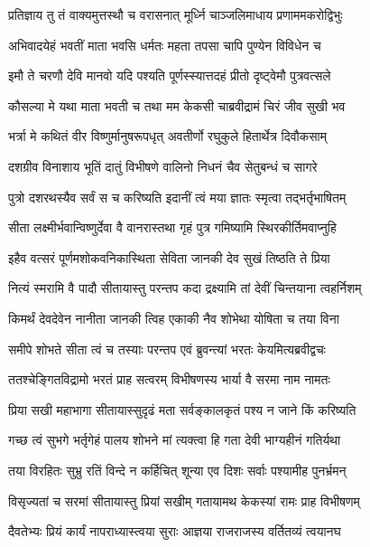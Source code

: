 \twolineshloka
{प्रतिज्ञाय तु तं वाक्यमुत्तस्थौ च वरासनात्}
{मूर्ध्नि चाञ्जलिमाधाय प्रणाममकरोद्विभुः}%

\twolineshloka
{अभिवादयेहं भवतीं माता भवसि धर्मतः}
{महता तपसा चापि पुण्येन विविधेन च}%

\twolineshloka
{इमौ ते चरणौ देवि मानवो यदि पश्यति}
{पूर्णस्स्यात्तदहं प्रीतो दृष्ट्वेमौ पुत्रवत्सले}%

\twolineshloka
{कौसल्या मे यथा माता भवती च तथा मम}
{केकसी चाब्रवीद्रामं चिरं जीव सुखी भव}%

\twolineshloka
{भर्त्रा मे कथितं वीर विष्णुर्मानुषरूपधृत्}
{अवतीर्णो रघुकुले हितार्थेत्र दिवौकसाम्}%

\twolineshloka
{दशग्रीव विनाशाय भूतिं दातुं विभीषणे}
{वालिनो निधनं चैव सेतुबन्धं च सागरे}%

\twolineshloka
{पुत्रो दशरथस्यैव सर्वं स च करिष्यति}
{इदानीं त्वं मया ज्ञातः स्मृत्वा तद्भर्तृभाषितम्}%

\twolineshloka
{सीता लक्ष्मीर्भवान्विष्णुर्देवा वै वानरास्तथा}
{गृहं पुत्र गमिष्यामि स्थिरकीर्तिमवाप्नुहि}%


\twolineshloka
{इहैव वत्सरं पूर्णमशोकवनिकास्थिता}
{सेविता जानकी देव सुखं तिष्ठति ते प्रिया}%

\twolineshloka
{नित्यं स्मरामि वै पादौ सीतायास्तु परन्तप}
{कदा द्रक्ष्यामि तां देवीं चिन्तयाना त्वहर्निशम्}%

\twolineshloka
{किमर्थं देवदेवेन नानीता जानकी त्विह}
{एकाकी नैव शोभेथा योषिता च तया विना}%

\twolineshloka
{समीपे शोभते सीता त्वं च तस्याः परन्तप}
{एवं ब्रुवन्त्यां भरतः केयमित्यब्रवीद्वचः}%

\twolineshloka
{ततश्चेङ्गितविद्रामो भरतं प्राह सत्वरम्}
{विभीषणस्य भार्या वै सरमा नाम नामतः}%

\twolineshloka
{प्रिया सखी महाभागा सीतायास्सुदृढं मता}
{सर्वङ्कालकृतं पश्य न जाने किं करिष्यति}%

\twolineshloka
{गच्छ त्वं सुभगे भर्तृगेहं पालय शोभने}
{मां त्यक्त्वा हि गता देवी भाग्यहीनं गतिर्यथा}%

\twolineshloka
{तया विरहितः सुभ्रु रतिं विन्दे न कर्हिचित्}
{शून्या एव दिशः सर्वाः पश्यामीह पुनर्भ्रमन्}%

\twolineshloka
{विसृज्यतां च सरमां सीतायास्तु प्रियां सखीम्}
{गतायामथ केकस्यां रामः प्राह विभीषणम्}%

\twolineshloka
{दैवतेभ्यः प्रियं कार्यं नापराध्यास्त्वया सुराः}
{आज्ञया राजराजस्य वर्तितव्यं त्वयानघ}%

